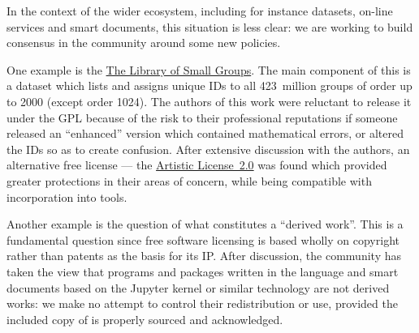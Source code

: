 \documentclass{deliverablereport}
\begin{document}
In the context of the wider \ODK
ecosystem, including for instance datasets, on-line services and smart
documents, this situation is less clear: we are working to build
consensus in the \GAP community around some new policies.

One example is the \href{https://www.gap-system.org/Packages/smallgrp.html}{The Library of Small Groups}. The main
component of this is a dataset which lists and assigns unique IDs to
all 423~million groups of order up to 2000 (except order 1024). The
authors of this work were reluctant to release it under the GPL
because of the risk to their professional reputations if someone
released an ``enhanced'' version which contained mathematical errors,
or altered the IDs so as to create confusion. After extensive
discussion with the authors, an alternative free license --- the
\href{https://opensource.org/licenses/Artistic-2.0}{Artistic License~2.0}
was found which provided greater
protections in their areas of concern, while being compatible with
incorporation into \ODK tools.

Another example is the question of what constitutes a ``derived
work''. This is a fundamental question since free software licensing is based
wholly on copyright rather than patents as the basis for its IP. After
discussion, the \GAP community has taken the view that programs and
packages written in the \GAP language and smart documents based on
the \GAP Jupyter kernel or similar technology are not derived works:
we make no attempt to control
their redistribution or use, provided the included copy of \GAP is
properly sourced and acknowledged.

\end{document}
